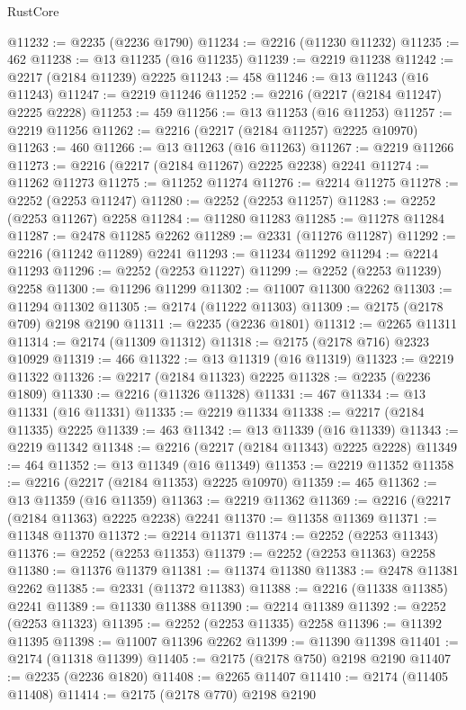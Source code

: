 \begin{lexlean}{RustCore}
\begin{coremodule}
@11232 := @2235 (@2236 @1790)
@11234 := @2216 (@11230 @11232)
@11235 := 462
@11238 := @13 @11235 (@16 @11235)
@11239 := @2219 @11238
@11242 := @2217 (@2184 @11239) @2225
@11243 := 458
@11246 := @13 @11243 (@16 @11243)
@11247 := @2219 @11246
@11252 := @2216 (@2217 (@2184 @11247) @2225 @2228)
@11253 := 459
@11256 := @13 @11253 (@16 @11253)
@11257 := @2219 @11256
@11262 := @2216 (@2217 (@2184 @11257) @2225 @10970)
@11263 := 460
@11266 := @13 @11263 (@16 @11263)
@11267 := @2219 @11266
@11273 := @2216 (@2217 (@2184 @11267) @2225 @2238) @2241
@11274 := @11262 @11273
@11275 := @11252 @11274
@11276 := @2214 @11275
@11278 := @2252 (@2253 @11247)
@11280 := @2252 (@2253 @11257)
@11283 := @2252 (@2253 @11267) @2258
@11284 := @11280 @11283
@11285 := @11278 @11284
@11287 := @2478 @11285 @2262
@11289 := @2331 (@11276 @11287)
@11292 := @2216 (@11242 @11289) @2241
@11293 := @11234 @11292
@11294 := @2214 @11293
@11296 := @2252 (@2253 @11227)
@11299 := @2252 (@2253 @11239) @2258
@11300 := @11296 @11299
@11302 := @11007 @11300 @2262
@11303 := @11294 @11302
@11305 := @2174 (@11222 @11303)
@11309 := @2175 (@2178 @709) @2198 @2190
@11311 := @2235 (@2236 @1801)
@11312 := @2265 @11311
@11314 := @2174 (@11309 @11312)
@11318 := @2175 (@2178 @716) @2323 @10929
@11319 := 466
@11322 := @13 @11319 (@16 @11319)
@11323 := @2219 @11322
@11326 := @2217 (@2184 @11323) @2225
@11328 := @2235 (@2236 @1809)
@11330 := @2216 (@11326 @11328)
@11331 := 467
@11334 := @13 @11331 (@16 @11331)
@11335 := @2219 @11334
@11338 := @2217 (@2184 @11335) @2225
@11339 := 463
@11342 := @13 @11339 (@16 @11339)
@11343 := @2219 @11342
@11348 := @2216 (@2217 (@2184 @11343) @2225 @2228)
@11349 := 464
@11352 := @13 @11349 (@16 @11349)
@11353 := @2219 @11352
@11358 := @2216 (@2217 (@2184 @11353) @2225 @10970)
@11359 := 465
@11362 := @13 @11359 (@16 @11359)
@11363 := @2219 @11362
@11369 := @2216 (@2217 (@2184 @11363) @2225 @2238) @2241
@11370 := @11358 @11369
@11371 := @11348 @11370
@11372 := @2214 @11371
@11374 := @2252 (@2253 @11343)
@11376 := @2252 (@2253 @11353)
@11379 := @2252 (@2253 @11363) @2258
@11380 := @11376 @11379
@11381 := @11374 @11380
@11383 := @2478 @11381 @2262
@11385 := @2331 (@11372 @11383)
@11388 := @2216 (@11338 @11385) @2241
@11389 := @11330 @11388
@11390 := @2214 @11389
@11392 := @2252 (@2253 @11323)
@11395 := @2252 (@2253 @11335) @2258
@11396 := @11392 @11395
@11398 := @11007 @11396 @2262
@11399 := @11390 @11398
@11401 := @2174 (@11318 @11399)
@11405 := @2175 (@2178 @750) @2198 @2190
@11407 := @2235 (@2236 @1820)
@11408 := @2265 @11407
@11410 := @2174 (@11405 @11408)
@11414 := @2175 (@2178 @770) @2198 @2190

\end{coremodule}
\end{lexlean}
